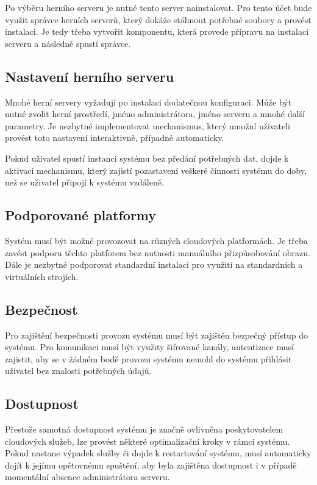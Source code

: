 Po výběru herního serveru je nutné tento server nainstalovat. Pro tento účet bude využit správce herních serverů, který dokáže stáhnout potřebné soubory
a provést instalaci. Je tedy třeba vytvořit komponentu, která provede přípravu na instalaci serveru a následně spustí správce.

\subsection{Nastavení herního serveru}

Mnohé herní servery vyžadují po instalaci dodatečnou konfiguraci. Může být nutné zvolit herní prostředí, jméno administrátora, jméno serveru a mnohé další parametry.
Je nezbytné implementovat mechanismus, který umožní uživateli provést toto nastavení interaktivně, případně automaticky.

Pokud uživatel spustí instanci systému bez předání potřebných dat, dojde k aktivaci mechanismu, který zajistí pozastavení veškeré činnosti systému do doby, než
se uživatel připojí k systému vzdáleně.

\subsection{Podporované platformy}

Systém musí být možné provozovat na různých cloudových platformách. Je třeba zavést podporu těchto platforem bez nutnosti manuálního přizpůsobování obrazu.
Dále je nezbytné podporovat standardní instalaci pro využití na standardních a virtuálních strojích.

\subsection{Bezpečnost}

Pro zajištění bezpečnosti provozu systému musí být zajištěn bezpečný přístup do systému. Pro komunikaci musí být využity šifrované kanály, autentizace
musí zajistit, aby se v žádném bodě provozu systému nemohl do systému přihlásit uživatel bez znalosti potřebných údajů.

\subsection{Dostupnost}

Přestože samotná dostupnost systému je značně ovlivněna poskytovatelem cloudových služeb, lze provést některé optimalizační kroky v rámci systému.
Pokud nastane výpadek služby či dojde k restartování systému, musí automaticky dojít k jejímu opětovnému spuštění, aby byla zajištěna dostupnost i v případě
momentální absence administrátora serveru.


